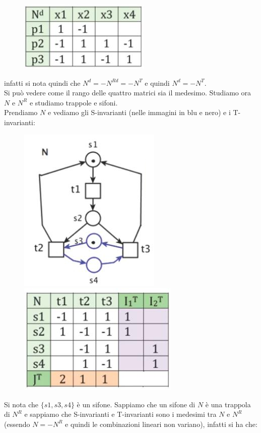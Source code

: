 \documentclass[a4paper,12pt, oneside]{book}
\begin{document}
\begin{esempio}
\begin{figure}[H]
    \includegraphics[scale = 0.6]{img/dr3.jpg}
  \end{figure}
  infatti si nota quindi che $N^d=-N^{Rd}=-N^T$ e quindi $N^d=-N^T$.\\
  Si può vedere come il rango delle quattro matrici sia il medesimo. Studiamo
  ora $N$ e $N^R$ e studiamo trappole e sifoni.\\
  Prendiamo $N$ e vediamo gli S-invarianti (nelle immagini in blu e nero) e i
  T-invarianti: 
  \begin{figure}[H]
    \centering
    \includegraphics[scale = 1.8]{img/dr9.jpg}
    \includegraphics[scale = 0.5]{img/dr10.jpg}
  \end{figure}
  Si nota che $\{s1,s3,s4\}$ è un sifone. Sappiamo che un sifone di $N$ è una
  trappola di $N^R$ e sappiamo che S-invarianti e T-invarianti sono i medesimi
  tra $N$ e $N^R$ (essendo $N=-N^R$ e quindi le combinazioni lineari non
  variano), infatti si ha che: 

\end{esempio}
\end{document}
